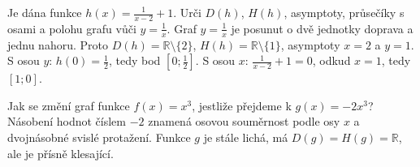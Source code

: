 \documentclass[11pt,a4paper]{article}
\begin{document}
\begin{center}
\end{center}

\begin{prikladReseniBox}[title={Příklad 5}]
Je dána funkce $h(x)=\frac{1}{x-2}+1$. Urči $D(h)$, $H(h)$, asymptoty, průsečíky s osami a polohu grafu vůči $y=\frac{1}{x}$.
\tcblower
Graf $y=\frac{1}{x}$ je posunut o dvě jednotky doprava a jednu nahoru. Proto $D(h)=\mathbb R\setminus\{2\}$, $H(h)=\mathbb R\setminus\{1\}$, asymptoty $x=2$ a $y=1$. S osou $y$: $h(0)=\frac{1}{2}$, tedy bod $[0;\frac{1}{2}]$. S osou $x$: $\frac{1}{x-2}+1=0$, odkud $x=1$, tedy $[1;0]$.
\end{prikladReseniBox}

\begin{prikladReseniBox}[title={Příklad 6}]
Jak se změní graf funkce $f(x)=x^3$, jestliže přejdeme k $g(x)=-2x^3$?
\tcblower
Násobení hodnot číslem $-2$ znamená osovou souměrnost podle osy $x$ a dvojnásobné svislé protažení. Funkce $g$ je stále lichá, má $D(g)=H(g)=\mathbb R$, ale je přísně klesající.
\end{prikladReseniBox}
\end{document}

